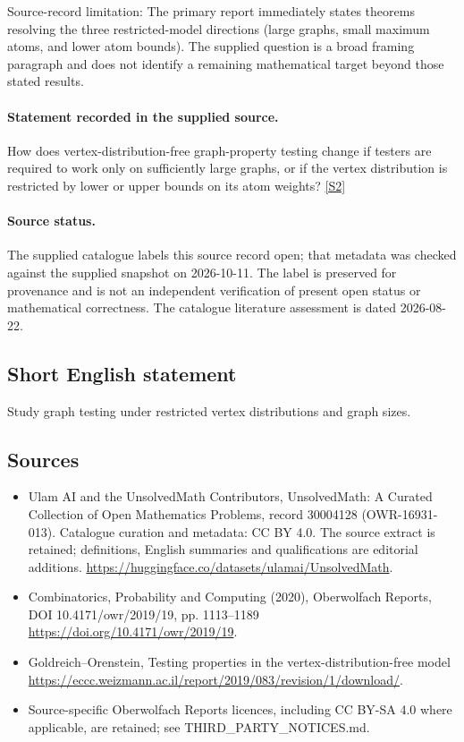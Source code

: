 \documentclass[11pt]{article}
\begin{document}
Source-record limitation: The primary report immediately states theorems resolving the three restricted-model directions (large graphs, small maximum atoms, and lower atom bounds). The supplied question is a broad framing paragraph and does not identify a remaining mathematical target beyond those stated results.
\paragraph{Statement recorded in the supplied source.}
How does vertex-distribution-free graph-property testing change if testers are required to work only on sufficiently large graphs, or if the vertex distribution is restricted by lower or upper bounds on its atom weights? \href{https://doi.org/10.4171/owr/2019/19}{[S2]}
\paragraph{Source status.}
The supplied catalogue labels this source record open; that metadata was checked against the supplied snapshot on 2026-10-11. The label is preserved for provenance and is not an independent verification of present open status or mathematical correctness. The catalogue literature assessment is dated 2026-08-22.
\subsection{Short English statement}
Study graph testing under restricted vertex distributions and graph sizes.
\subsection{Sources}
\begin{itemize}
\item[S1] Ulam AI and the UnsolvedMath Contributors, UnsolvedMath: A Curated Collection of Open Mathematics Problems, record 30004128 (OWR-16931-013). Catalogue curation and metadata: CC BY 4.0. The source extract is retained; definitions, English summaries and qualifications are editorial additions.
\url{https://huggingface.co/datasets/ulamai/UnsolvedMath}.
\item[S2] Combinatorics, Probability and Computing (2020), Oberwolfach Reports, DOI 10.4171/owr/2019/19, pp. 1113--1189
\url{https://doi.org/10.4171/owr/2019/19}.
\item[S3] Goldreich--Orenstein, Testing properties in the vertex-distribution-free model
\url{https://eccc.weizmann.ac.il/report/2019/083/revision/1/download/}.
\item Source-specific Oberwolfach Reports licences, including CC BY-SA 4.0 where applicable, are retained; see THIRD\_PARTY\_NOTICES.md.
\end{itemize}
\end{document}
